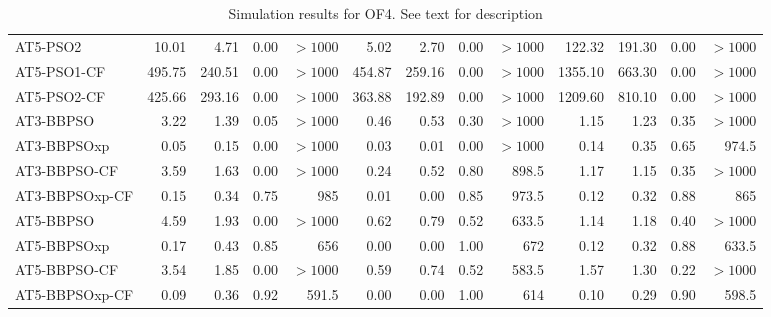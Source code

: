 \documentclass[cmbright]{staauth}
\begin{document}
\begin{table}[ht]
\begin{tabular}{l|rrrr|rrrr|rrrr}
  AT5-PSO2 & 10.01 & 4.71 & 0.00 & $> 1000$ & 5.02 & 2.70 & 0.00 & $> 1000$ & 122.32 & 191.30 & 0.00 & $> 1000$ \\
  AT5-PSO1-CF & 495.75 & 240.51 & 0.00 & $> 1000$ & 454.87 & 259.16 & 0.00 & $> 1000$ & 1355.10 & 663.30 & 0.00 & $> 1000$ \\
  AT5-PSO2-CF & 425.66 & 293.16 & 0.00 & $> 1000$ & 363.88 & 192.89 & 0.00 & $> 1000$ & 1209.60 & 810.10 & 0.00 & $> 1000$ \\
   \hline
AT3-BBPSO & 3.22 & 1.39 & 0.05 & $> 1000$ & 0.46 & 0.53 & 0.30 & $> 1000$ & 1.15 & 1.23 & 0.35 & $> 1000$ \\
  AT3-BBPSOxp & 0.05 & 0.15 & 0.00 & $> 1000$ & 0.03 & 0.01 & 0.00 & $> 1000$ & 0.14 & 0.35 & 0.65 & 974.5 \\
  AT3-BBPSO-CF & 3.59 & 1.63 & 0.00 & $> 1000$ & 0.24 & 0.52 & 0.80 & 898.5 & 1.17 & 1.15 & 0.35 & $> 1000$ \\
  AT3-BBPSOxp-CF & 0.15 & 0.34 & 0.75 & 985 & 0.01 & 0.00 & 0.85 & 973.5 & 0.12 & 0.32 & 0.88 & 865 \\
   \hline
AT5-BBPSO & 4.59 & 1.93 & 0.00 & $> 1000$ & 0.62 & 0.79 & 0.52 & 633.5 & 1.14 & 1.18 & 0.40 & $> 1000$ \\
  AT5-BBPSOxp & 0.17 & 0.43 & 0.85 & 656 & 0.00 & 0.00 & 1.00 & 672 & 0.12 & 0.32 & 0.88 & 633.5 \\
  AT5-BBPSO-CF & 3.54 & 1.85 & 0.00 & $> 1000$ & 0.59 & 0.74 & 0.52 & 583.5 & 1.57 & 1.30 & 0.22 & $> 1000$ \\
  AT5-BBPSOxp-CF & 0.09 & 0.36 & 0.92 & 591.5 & 0.00 & 0.00 & 1.00 & 614 & 0.10 & 0.29 & 0.90 & 598.5 \\
   \hline
\end{tabular}
\endgroup
\caption{Simulation results for OF4. See text for description}
\label{tab:psosim4}
\end{table}
\end{document}
